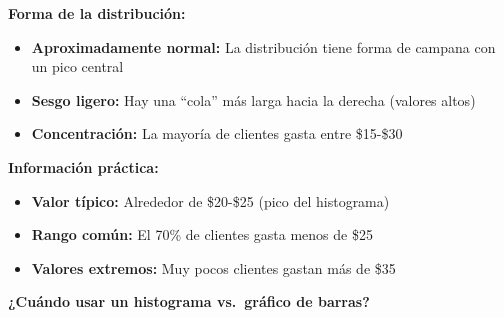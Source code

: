 \documentclass[
  spanish,
  letterpaper,
  DIV=11,
  numbers=noendperiod]{scrreprt}
\providecommand{\tightlist}{%
  \setlength{\itemsep}{0pt}\setlength{\parskip}{0pt}}
\begin{document}
\begin{tcolorbox}[enhanced jigsaw, toptitle=1mm, opacitybacktitle=0.6, leftrule=.75mm, arc=.35mm, title=\textcolor{quarto-callout-note-color}{\faInfo}\hspace{0.5em}{Interpretación del histograma}, colback=white, bottomrule=.15mm, colbacktitle=quarto-callout-note-color!10!white, opacityback=0, bottomtitle=1mm, breakable, rightrule=.15mm, coltitle=black, left=2mm, titlerule=0mm, colframe=quarto-callout-note-color-frame, toprule=.15mm]

\textbf{Forma de la distribución:}

\begin{itemize}
\tightlist
\item
  \textbf{Aproximadamente normal:} La distribución tiene forma de
  campana con un pico central
\item
  \textbf{Sesgo ligero:} Hay una ``cola'' más larga hacia la derecha
  (valores altos)
\item
  \textbf{Concentración:} La mayoría de clientes gasta entre \$15-\$30
\end{itemize}

\textbf{Información práctica:}

\begin{itemize}
\tightlist
\item
  \textbf{Valor típico:} Alrededor de \$20-\$25 (pico del histograma)
\item
  \textbf{Rango común:} El 70\% de clientes gasta menos de \$25
\item
  \textbf{Valores extremos:} Muy pocos clientes gastan más de \$35
\end{itemize}

\end{tcolorbox}

\textbf{¿Cuándo usar un histograma vs.~gráfico de barras?}
\end{document}
